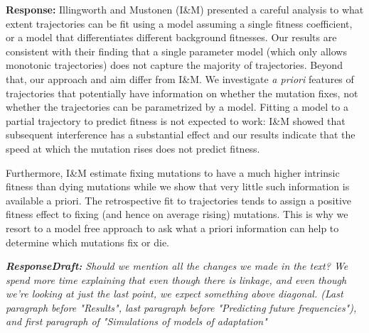 \documentclass[aps,rmp,onecolumn]{revtex4-1}
\newcommand{\response}[1]{{\it {\color{response}\textbf{Response:} #1}}\vskip 5mm}
\newcommand{\responsedraft}[1]{{\it {\color{purple}\textbf{ResponseDraft:} #1}}\vskip 5mm}
\begin{document}
\response{
	Illingworth and Mustonen (I\&M) presented a careful analysis to what extent trajectories can be fit using a model assuming a single fitness coefficient, or a model that differentiates different background fitnesses.
	Our results are consistent with their finding that a single parameter model (which only allows monotonic trajectories) does not capture the majority of trajectories.
	Beyond that, our approach and aim differ from I\&M.
	We investigate \emph{a priori} features of trajectories that potentially have information on whether the mutation fixes, not whether the trajectories can be parametrized by a model.
	Fitting a model to a partial trajectory to predict fitness is not expected to work: I\&M showed that subsequent interference has a substantial effect and our results indicate that the speed at which the mutation rises does not predict fitness.

	Furthermore, I\&M estimate fixing mutations to have a much higher intrinsic fitness than dying mutations while we show that very little such information is available a priori.
	The retrospective fit to trajectories tends to assign a positive fitness effect to fixing (and hence on average rising) mutations.
	This is why we resort to a model free approach to ask what a priori information can help to determine which mutations fix or die.
}
\responsedraft{Should we mention all the changes we made in the text? 
We spend more time explaining that even though there is linkage, and even though we're looking at just the last point, we expect something above diagonal. 
(Last paragraph before "Results", last paragraph before "Predicting future frequencies"), and first paragraph of "Simulations of models of adaptation"}
\end{document}
